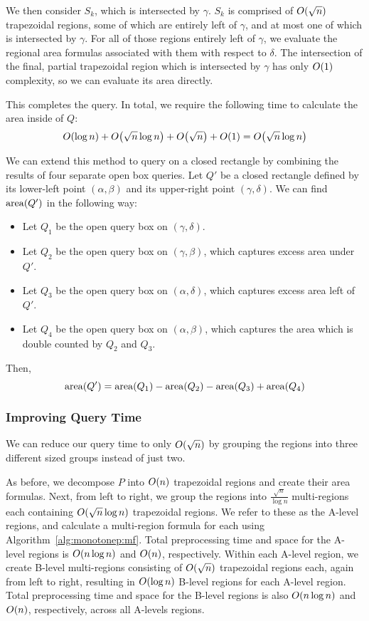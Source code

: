 {We then consider $S_k$, which is intersected by $\gamma$.
$S_k$ is comprised of $O\!\left(\sqrt{n}\right)$ trapezoidal regions, some of which are 
entirely left of $\gamma$, and at most one of which is intersected by $\gamma$. 
For all of those regions entirely left of $\gamma$, we evaluate the regional 
area formulas associated with them with respect to $\delta$. 
The intersection of the final, partial trapezoidal region which is intersected 
by $\gamma$ has only $O\!\left(1\right)$ complexity, so we can evaluate its area 
directly.

This completes the query. In total, we require the following time to calculate 
the area inside of $Q$:
\[ 
O\!\left(\log{n}\right) + O\!\left(\sqrt{n}\log{n}\right) + O\!\left(\sqrt{n}\right) + O\!\left(1\right) = 
O\!\left(\sqrt{n}\log{n}\right)
\]

  We can extend this method to query on a closed rectangle by combining the 
results of four separate open box queries.
Let $Q'$ be a closed rectangle defined by its lower-left point $(\alpha, \beta)$ 
and its upper-right point $(\gamma, \delta)$.
We can find $\operatorname{area}\!\left(Q'\right)$ in the following way:

\begin{itemize}
\item Let $Q_1$ be the open query box on $(\gamma, \delta)$.
\item Let $Q_2$ be the open query box on $(\gamma, \beta)$, which captures 
excess area under $Q'$.
\item Let $Q_3$ be the open query box on $(\alpha, \delta)$, which captures 
excess area left of $Q'$.
\item Let $Q_4$ be the open query box on $(\alpha, \beta)$, which captures the 
area which is double counted by $Q_2$ and $Q_3$.
\end{itemize}

  Then,
\[
\operatorname{area}\!\left(Q'\right) = \operatorname{area}\!\left(Q_1\right) - \operatorname{area}\!\left(Q_2\right) - \operatorname{area}\!\left(Q_3\right) + \operatorname{area}\!\left(Q_4\right)
\]

\subsubsection{Improving Query Time}
\label{:mono2:bitfaster}

We can reduce our query time to only $O\!\left(\sqrt{n}\right)$ by grouping the regions 
into three different sized groups instead of just two.

As before, we decompose $P$ into $O\!\left(n\right)$ trapezoidal regions and create 
their area formulas.
Next, from left to right, we group the regions into $\frac{\sqrt{n}}{\log{n}}$ 
multi-regions each containing $O\!\left(\sqrt{n}\log{n}\right)$ trapezoidal regions.
We refer to these as the A-level regions, and calculate a multi-region formula 
for each using Algorithm~\ref{alg:monotonep:mf}.
Total preprocessing time and space for the A-level regions is $O\!\left(n\log{n}\right)$ 
and $O\!\left(n\right)$, respectively.
Within each A-level region, we create B-level multi-regions consisting of 
$O\!\left(\sqrt{n}\right)$ trapezoidal regions each, again from left to right, resulting 
in $O\!\left(\log{n}\right)$ B-level regions for each A-level region.
Total preprocessing time and space for the B-level regions is also 
$O\!\left(n\log{n}\right)$ and $O\!\left(n\right)$, respectively, across all A-levels regions.

}
